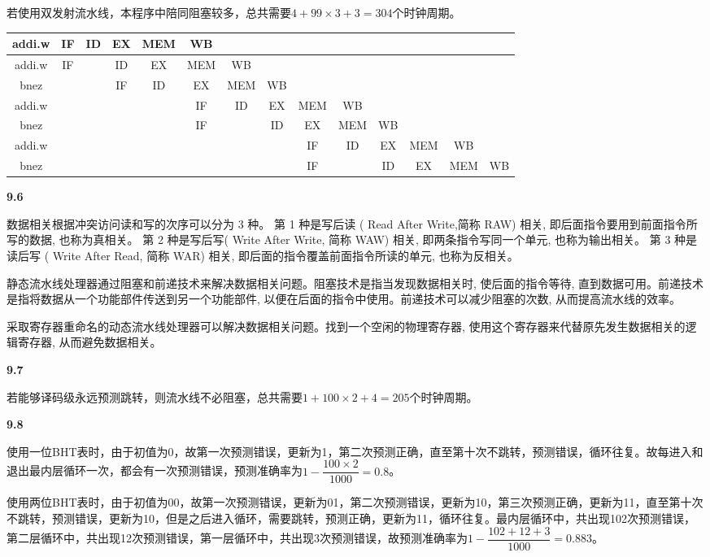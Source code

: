 \documentclass[UTF8]{report}
\begin{document}
若使用双发射流水线，本程序中陪同阻塞较多，总共需要$4 + 99 \times 3 + 3 = 304$个时钟周期。

\begin{table}[H]
    \centering
    \begin{tabular}{|c|c|c|c|c|c|c|c|c|c|c|c|c|c|}
    \hline
    addi.w&IF&ID&EX&MEM&WB&&&&&&&&\\
    \hline
    addi.w&IF&&ID&EX&MEM&WB&&&&&&&\\
    \hline
    bnez&&&IF&ID&EX&MEM&WB&&&&&&\\
    \hline
    addi.w&&&&&IF&ID&EX&MEM&WB&&&&\\
    \hline
    bnez&&&&&IF&&ID&EX&MEM&WB&&&\\
    \hline
    addi.w&&&&&&&&IF&ID&EX&MEM&WB&\\
    \hline
    bnez&&&&&&&&IF&&ID&EX&MEM&WB\\
    \hline
    \end{tabular}
\end{table}

\noindent
\textbf{9.6}

数据相关根据冲突访问读和写的次序可以分为 3 种。 第 1 种是写后读 ( Read After Write,简称 RAW) 相关, 即后面指令要用到前面指令所写的数据, 也称为真相关。 第 2 种是写后写( Write After Write, 简称 WAW) 相关, 即两条指令写同一个单元, 也称为输出相关。 第 3 种是读后写 ( Write After Read, 简称 WAR) 相关, 即后面的指令覆盖前面指令所读的单元, 也称为反相关。

静态流水线处理器通过阻塞和前递技术来解决数据相关问题。阻塞技术是指当发现数据相关时, 使后面的指令等待, 直到数据可用。前递技术是指将数据从一个功能部件传送到另一个功能部件, 以便在后面的指令中使用。前递技术可以减少阻塞的次数, 从而提高流水线的效率。

采取寄存器重命名的动态流水线处理器可以解决数据相关问题。找到一个空闲的物理寄存器, 使用这个寄存器来代替原先发生数据相关的逻辑寄存器, 从而避免数据相关。

\noindent
\textbf{9.7}

若能够译码级永远预测跳转，则流水线不必阻塞，总共需要$1 + 100 \times 2 + 4 = 205$个时钟周期。

\noindent
\textbf{9.8}

使用一位BHT表时，由于初值为0，故第一次预测错误，更新为1，第二次预测正确，直至第十次不跳转，预测错误，循环往复。故每进入和退出最内层循环一次，都会有一次预测错误，预测准确率为$1 - \dfrac{100 \times 2}{1000} = 0.8$。

使用两位BHT表时，由于初值为00，故第一次预测错误，更新为01，第二次预测错误，更新为10，第三次预测正确，更新为11，直至第十次不跳转，预测错误，更新为10，但是之后进入循环，需要跳转，预测正确，更新为11，循环往复。最内层循环中，共出现102次预测错误，第二层循环中，共出现12次预测错误，第一层循环中，共出现3次预测错误，故预测准确率为$1 - \dfrac{102 + 12 + 3}{1000} = 0.883$。
\end{document}
